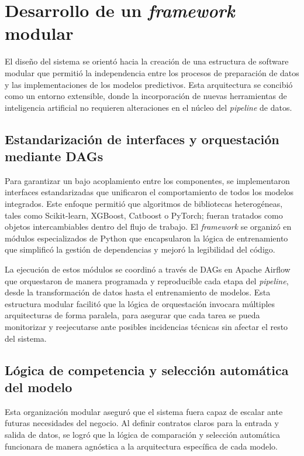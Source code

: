 \section{Desarrollo de un \textit{framework} modular}

El diseño del sistema se orientó hacia la creación de una estructura de software modular que permitió la independencia entre los procesos de preparación de datos y las implementaciones de los modelos predictivos. Esta arquitectura se concibió como un entorno extensible, donde la incorporación de nuevas herramientas de inteligencia artificial no requieren alteraciones en el núcleo del \textit{pipeline} de datos.

\subsection{Estandarización de interfaces y orquestación mediante DAGs}

Para garantizar un bajo acoplamiento entre los componentes, se implementaron interfaces estandarizadas que unificaron el comportamiento de todos los modelos integrados. Este enfoque permitió que algoritmos de bibliotecas heterogéneas, tales como Scikit-learn, XGBoost, Catboost o PyTorch; fueran tratados como objetos intercambiables dentro del flujo de trabajo. El \textit{framework} se organizó en módulos especializados de Python que encapsularon la lógica de entrenamiento que simplificó la gestión de dependencias y mejoró la legibilidad del código.

La ejecución de estos módulos se coordinó a través de DAGs en Apache Airflow que orquestaron de manera programada y reproducible cada etapa del \textit{pipeline}, desde la transformación de datos hasta el entrenamiento de modelos. Esta estructura modular facilitó que la lógica de orquestación invocara múltiples arquitecturas de forma paralela, para asegurar que cada tarea se pueda monitorizar y reejecutarse ante posibles incidencias técnicas sin afectar el resto del sistema.

\subsection{Lógica de competencia y selección automática del modelo}

Esta organización modular aseguró que el sistema fuera capaz de escalar ante futuras necesidades del negocio. Al definir contratos claros para la entrada y salida de datos, se logró que la lógica de comparación y selección automática funcionara de manera agnóstica a la arquitectura específica de cada modelo.

